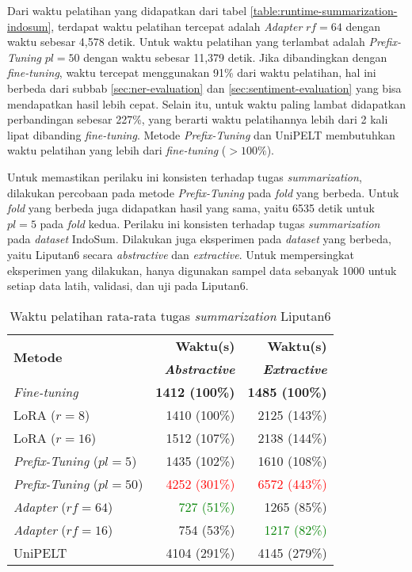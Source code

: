 Dari waktu pelatihan yang didapatkan dari tabel \ref{table:runtime-summarization-indosum}, terdapat waktu pelatihan tercepat adalah \textit{Adapter} $rf=64$ dengan waktu sebesar 4,578 detik. Untuk waktu pelatihan yang terlambat adalah \textit{Prefix-Tuning} $pl=50$ dengan waktu sebesar 11,379 detik. Jika dibandingkan dengan \textit{fine-tuning}, waktu tercepat menggunakan 91\% dari waktu pelatihan, hal ini berbeda dari subbab \ref{sec:ner-evaluation} dan \ref{sec:sentiment-evaluation} yang bisa mendapatkan hasil lebih cepat. Selain itu, untuk waktu paling lambat didapatkan perbandingan sebesar 227\%, yang berarti waktu pelatihannya lebih dari 2 kali lipat dibanding \textit{fine-tuning}. Metode \textit{Prefix-Tuning} dan UniPELT membutuhkan waktu pelatihan yang lebih dari \textit{fine-tuning} ($>100\%$). 

Untuk memastikan perilaku ini konsisten terhadap tugas \textit{summarization}, dilakukan percobaan pada metode \textit{Prefix-Tuning} pada \textit{fold} yang berbeda. Untuk \textit{fold} yang berbeda juga didapatkan hasil yang sama, yaitu 6535 detik untuk $pl=5$ pada \textit{fold} kedua. Perilaku ini konsisten terhadap tugas \textit{summarization} pada \textit{dataset} IndoSum. Dilakukan juga eksperimen pada \textit{dataset} yang berbeda, yaitu Liputan6 secara \textit{abstractive} dan \textit{extractive}. Untuk mempersingkat eksperimen yang dilakukan, hanya digunakan sampel data sebanyak 1000 untuk setiap data latih, validasi, dan uji pada Liputan6.

\begin{table}[h]
    \centering
    \caption{Waktu pelatihan rata-rata tugas \textit{summarization} Liputan6}
    \label{table:runtime-summarization-liputan6}
    \begin{tabular}{l|r|r}
        \toprule
        \multirow{2}{*}{\textbf{Metode}} & \textbf{Waktu(s)}  & \textbf{Waktu(s)}  \\
                                         & \textbf{\textit{Abstractive}} & \textbf{\textit{Extractive}} \\
        \midrule
        \textit{Fine-tuning} & \textbf{1412 (100\%)} & \textbf{1485 (100\%)} \\
        LoRA ($r=8$) & 1410 (100\%) & 2125 (143\%) \\
        LoRA ($r=16$) & 1512 (107\%) & 2138 (144\%) \\
        \textit{Prefix-Tuning} ($pl=5$) & 1435 (102\%) & 1610 (108\%) \\
        \textit{Prefix-Tuning} ($pl=50$) & \textcolor{Red}{4252 (301\%)} & \textcolor{Red}{6572 (443\%)} \\
        \textit{Adapter} ($rf=64$) & \textcolor{Green}{727 (51\%)} & 1265 (85\%) \\
        \textit{Adapter} ($rf=16$) & 754 (53\%) & \textcolor{Green}{1217 (82\%)} \\
        UniPELT & 4104 (291\%) & 4145 (279\%) \\
        \bottomrule
    \end{tabular}
\end{table}

